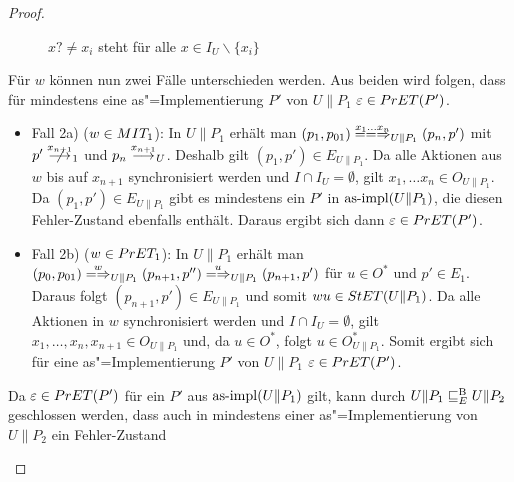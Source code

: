 \begin{proof}
\begin{itemize}
\begin{figure} [h!tbp]
\begin{center}
        \caption{$x?\neq x_i$ steht für alle $x\in I_U\backslash\{x_i\}$}
      \label{UohneE}
      \end{center}
      \end{figure}
      Für $w$ können nun zwei Fälle unterschieden werden. Aus beiden wird
      folgen, dass für mindestens eine as"=Implementierung $P'$ von $U\|P_1$
      $\varepsilon\in PrET(P')$.
      \begin{itemize}
        \item Fall 2a) ($w\in MIT _1$): In $U\|P_1$ erhält man $(p_1,p_{01})
          \lweakmay[x_1\dots x_n]_{U\|P_1} (p_n,p')$ mit $p'\nmust[x_{n+1}]_1$
          und $p_n\must[x_{n+1}]_U$. Deshalb gilt $(p_1,p')\in E_{U\|P_1}$. Da
          alle Aktionen aus $w$ bis auf $x_{n+1}$ synchronisiert werden und
          $I\cap I_U=\emptyset$, gilt $x_1,\dots x_n\in O_{U\|P_1}$. Da
          $(p_1,p')\in E_{U\|P_1}$ gibt es mindestens ein $P'$ in $\mathrm{as}\text{-}\mathrm{impl}
          (U\|P_1)$, die diesen Fehler-Zustand ebenfalls enthält. Daraus ergibt
          sich dann $\varepsilon\in PrET (P')$.
        \item Fall 2b) ($w\in PrET _1$): In $U\|P_1$ erhält man $(p_0,p_{01})
          \weakmay[w]_{U\|P_1}(p_{n+1},p'')\weakmay[u]_{U\|P_1}(p_{n+1},p')$
          für $u\in O^*$ und $p'\in E_1$. Daraus folgt $(p_{n+1},p')\in
          E_{U\|P_1}$ und somit $wu\in StET (U\|P_1)$. Da alle Aktionen in $w$
          synchronisiert werden und $I\cap I_U=\emptyset$, gilt $x_1,\dots
          ,x_n,x_{n+1}\in O_{U\|P_1}$ und, da $u\in O^*$, folgt $u\in
          O_{U\|P_1}^*$. Somit ergibt sich für eine as"=Implementierung $P'$ von
          $U\|P_1$ $\varepsilon\in PrET (P')$.
      \end{itemize}
      Da $\varepsilon\in PrET (P')$ für ein $P'$ aus $\mathrm{as}\text{-}\mathrm{impl} (U\|P_1)$ gilt,
      kann durch $U\|P_1 \sqsubseteq  _E^\mathrm{B} U\|P_2$ geschlossen werden, dass auch in
      mindestens einer as"=Implementierung von $U\|P_2$ ein Fehler-Zustand

\end{itemize}
\end{proof}
